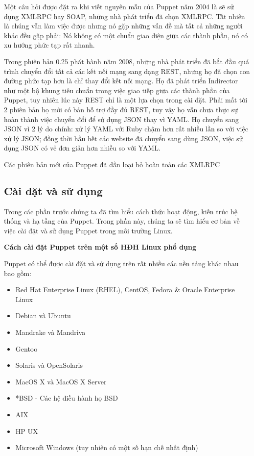 Một câu hỏi được đặt ra khi viết nguyên mẫu của Puppet năm 2004 là sẽ sử dụng XMLRPC hay SOAP, những nhà phát triển đã chọn XMLRPC. Tất nhiên là chúng vẫn làm việc được nhưng nó gặp những vấn đề mà tất cả những người khác đều gặp phải: Nó không có một chuẩn giao diện giữa các thành phần, nó có xu hướng phức tạp rất nhanh.

Trong phiên bản 0.25 phát hành năm 2008, những nhà phát triển đã bắt đầu quá trình chuyển đổi tất cả các kết nối mạng sang dạng REST, nhưng họ đã chọn con đường phức tạp hơn là chỉ thay đổi kết nối mạng. Họ đã phát triển Indirector như một bộ khung tiêu chuẩn trong việc giao tiếp giữa các thành phần của Puppet, tuy nhiên lúc này REST chỉ là một lựa chọn trong cài đặt. Phải mất tới 2 phiên bản họ mới có bản hỗ trợ đầy đủ REST, tuy vậy họ vẫn chưa thực sự hoàn thành việc chuyển đổi để sử dụng JSON thay vì YAML. Họ chuyển sang JSON vì 2 lý do chính: xử lý YAML với Ruby chậm hơn rất nhiều lần so với việc xử lý JSON; đồng thời hầu hết các website đã chuyển sang dùng JSON, việc sử dụng JSON có vẻ đơn giản hơn nhiều so với YAML.

Các phiên bản mới của Puppet đã dần loại bỏ hoàn toàn các XMLRPC

\subsection{Cài đặt và sử dụng}

Trong các phần trước chúng ta đã tìm hiểu cách thức hoạt động, kiến trúc hệ thống và hạ tầng của Puppet. Trong phần này, chúng ta sẽ tìm hiểu cơ bản về việc cài đặt và sử dụng Puppet trong môi trường Linux.

\textbf{\large Cách cài đặt Puppet trên một số HĐH Linux phổ dụng}

Puppet có thể được cài đặt và sử dụng trên rất nhiều các nền tảng khác nhau bao gồm:

\begin{itemize}
\item Red Hat Enterprise Linux (RHEL), CentOS, Fedora \& Oracle Enterprise Linux
\item Debian và Ubuntu
\item Mandrake và Mandriva
\item Gentoo
\item Solaris và OpenSolaris
\item MacOS X và MacOS X Server
\item *BSD - Các hệ điều hành họ BSD
\item AIX
\item HP UX
\item Microsoft Windows (tuy nhiên có một số hạn chế nhất định)
\end{itemize}

